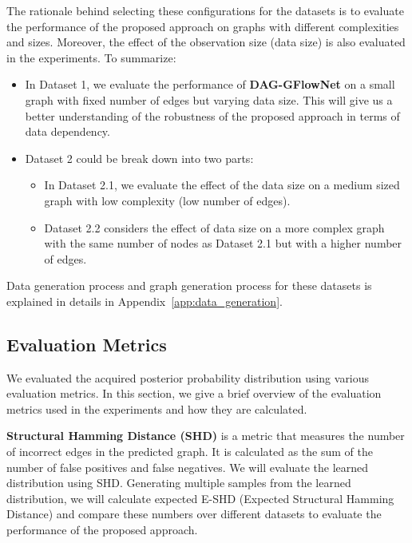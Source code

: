 \documentclass{lxaiproposal}
\begin{document}
    The rationale behind selecting these configurations for the datasets is to evaluate the performance of the proposed
    approach on graphs with different complexities and sizes. Moreover, the effect of the observation size (data
    size) is also evaluated in the experiments. To summarize:
    \begin{itemize}
        \item In Dataset 1, we evaluate the performance of \textbf{DAG-GFlowNet} on a small graph with fixed number
        of edges but varying data size. This will give us a better understanding of the robustness of the proposed
        approach in terms of data dependency.
        \item Dataset 2 could be break down into two parts:
        \begin{itemize}
            \item In Dataset 2.1, we evaluate the effect of the data size on a medium sized graph with low complexity (low number of edges).
            \item Dataset 2.2 considers the effect of data size on a more complex graph with the same number of
            nodes as Dataset 2.1 but with a higher number of edges.
        \end{itemize}
    \end{itemize}

    Data generation process and graph generation process for these datasets is explained in details in Appendix~\ref{app:data_generation}.

    \subsection{Evaluation Metrics}
    \vspace*{-3mm}

    We evaluated the acquired posterior probability distribution 
     using various evaluation metrics. In this
    section, we give a brief overview of the evaluation metrics used in the experiments and how they are calculated.
    
    \vspace*{3mm}
    \noindent\textbf{Structural Hamming Distance (SHD)} is a metric that measures the number of incorrect edges in the
    predicted graph. It is calculated as the sum of the number of false positives and false negatives. We will
    evaluate the learned distribution using SHD. Generating multiple samples from the learned distribution,
    we will calculate expected E-SHD (Expected Structural Hamming Distance) and compare these numbers over different
    datasets to evaluate the performance of the proposed approach.
\end{document}
